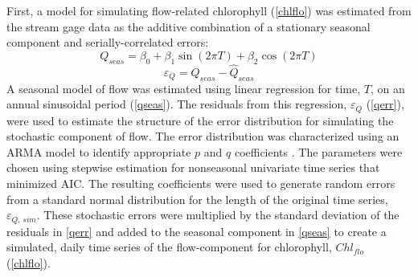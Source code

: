 \documentclass[letterpaper,12pt,oneside]{article}\usepackage[]{graphicx}\usepackage[]{color}
\begin{document}
First, a model for simulating flow-related chlorophyll (\cref{chlflo}) was estimated from the stream gage data as the additive combination of a stationary seasonal component and serially-correlated errors:
\begin{equation} \label{qseas}
Q_{seas} = \beta_0 + \beta_1 \sin\left(2\pi T\right) + \beta_2 \cos\left(2\pi T\right)
\end{equation}
\begin{equation} \label{qerr}
\varepsilon_{Q} = Q_{seas} - \widehat{Q}_{seas}
\end{equation}
A seasonal model of flow was estimated using linear regression for time, $T$, on an annual sinusoidal period (\cref{qseas}).  The residuals from this regression, $\varepsilon_{Q}$ (\cref{qerr}), were used to estimate the structure of the error distribution for simulating the stochastic component of flow.  The error distribution was characterized using an \ac{ARMA} model to identify appropriate $p$ and $q$ coefficients \citep{Hyndman08}.  The parameters were chosen using stepwise estimation for nonseasonal univariate time series that minimized \ac{AIC}.  The resulting coefficients were used to generate random errors from a standard normal distribution for the length of the original time series, $\varepsilon_{Q,\,sim}$.  These stochastic errors were multiplied by the standard deviation of the residuals in \cref{qerr} and added to the seasonal component in \cref{qseas} to create a simulated, daily time series of the flow-component for chlorophyll, $Chl_{flo}$ (\cref{chlflo}).
\end{document}
